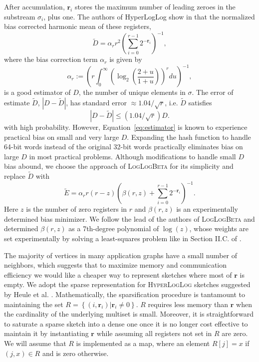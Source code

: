 \documentclass{vldb}
\newcommand{\algoname}[1]{\textnormal{\textsc{#1}}}
\begin{document}
After accumulation, $\mathbf{r}_i$ stores the maximum number of leading zeroes in the substream $\sigma_i$, plus one. 
The authors of HyperLogLog show in \cite{flajolet2007hyperloglog} that the normalized bias corrected harmonic mean of these registers,
%
\begin{equation} \label{eq:estimator}
\widetilde{D} = \alpha_r r^2 \left ( \sum_{i=0}^{r-1} 2^{-\mathbf{r}_i} \right) ^{-1},
\end{equation}
%
where the bias correction term $\alpha_r$ is given by
%
%
\begin{equation} \label{eq:alpha}
\alpha_r :=  \left( r \int_{0}^\infty \left( \log_2 \left( \frac{2 + u}{1 + u} \right) \right)^r du \right) ^{-1},
\end{equation}
is a good estimator of $D$, the number of unique elements in $\sigma$.
The error of estimate $\widetilde{D}$, $|D - \widetilde{D}|$, has standard error $\approx 1.04 / \sqrt{r}$, i.e. $\widetilde{D}$ satisfies
%
\begin{equation} \label{eq:error_bound}
|D - \widetilde{D}| \leq (1.04/\sqrt{r}) D.
\end{equation}
%
 with high probability.
 However, Equation~\ref{eq:estimator} is known to experience practical bias on small and very large $D$.
 Expanding the hash function to handle 64-bit words instead of the original 32-bit words practically eliminates bias on large $D$ in most practical problems.
 Although modifications to handle small $D$ bias abound, we choose the approach of \algoname{LogLogBeta} \cite{qin2016loglog} for its simplicity and replace $\widetilde{D}$ with  
%
\begin{equation} \label{eq:beta_estimator}
\widetilde{E} = \alpha_r r (r - z) \left ( \beta(r, z) + \sum_{i=0}^{r-1} 2^{-\mathbf{r}_i} \right) ^{-1}.
\end{equation}
%
Here $z$ is the number of zero registers in $r$ and $\beta(r, z)$ is an experimentally determined bias minimizer.
We follow the lead of the authors of \algoname{LogLogBeta} and determined $\beta(r, z)$ as a 7th-degree polynomial of $\log(z)$, whose weights are set experimentally by solving a least-squares problem like in Section II.C. of \cite{qin2016loglog}. 

The majority of vertices in many application graphs have a small number of neighbors, which suggests that to maximize memory and communication efficiency we would like a cheaper way to represent sketches where most of $\mathbf{r}$ is empty.
We adopt the sparse representation for \algoname{HyperLogLog} sketches suggested by Heule et al. \cite{heule2013hyperloglog}.
Mathematically, the sparsification procedure is tantamount to maintaining the set $R = \left \{(i, \mathbf{r}_i) | \mathbf{r}_i \neq 0 \right \}$.
$R$ requires less memory than $\mathbf{r}$ when the cardinality of the underlying multiset is small. 
Moreover, it is straightforward to saturate a sparse sketch into a dense one once it is no longer cost effective to maintain it by instantiating $\mathbf{r}$ while assuming all registers not set in $R$ are zero. 
We will assume that $R$ is implemented as a map, where an element $R[j] = x$ if $(j, x) \in R$ and is zero otherwise.
\end{document}
